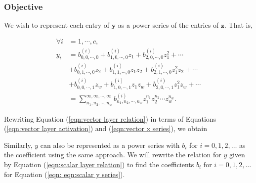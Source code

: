 \subsubsection{Objective}

We wish to represent each entry of $\mathbf{y}$ as a power series of the entries of $\mathbf{z}$. That is,

\begin{align}
    \forall i &= 1, \cdots, c, \nonumber \\ y_i
    &= b^{(i)}_{0,0,\cdots,0} + b^{(i)}_{1,0,\cdots,0} z_1 + b^{(i)}_{2,0,\cdots,0} z_1^2 + \cdots \nonumber \\
    &+ b^{(i)}_{0,1,\cdots,0} z_2 + b^{(i)}_{1,1,\cdots,0} z_1 z_2 + b^{(i)}_{2,1,\cdots,0} z_1^2 z_2 + \cdots \nonumber \\
    &+ b^{(i)}_{0,0,\cdots,1} z_w + b^{(i)}_{1,0,\cdots,1} z_1 z_w + b^{(i)}_{2,0,\cdots,1} z_1^2 z_w + \cdots \nonumber \\
    &= \sum_{n_1,n_2,\cdots,n_w}^{\infty,\infty,\cdots,\infty} b^{(i)}_{n_1,n_2,\cdots,n_w} z_1^{n_1} z_2^{n_2} \cdots z_w^{n_w}.
    \label{eqn:vector y series}
\end{align}

Rewriting Equation (\ref{eqn:vector layer relation}) in terms of Equations (\ref{eqn:vector layer activation}) and (\ref{eqn:vector x series}), we obtain

{\color{red} Similarly, $y$ can also be represented as a power series with $b_i$ for $i = 0, 1, 2, \ldots$ as the coefficient using the same approach. We will rewrite the relation for $y$ given by Equation (\ref{eqn:scalar layer relation}) to find the coefficients $b_i$ for $i = 0, 1, 2, \ldots$ for Equation (\ref{eqn: eqn:scalar y series}).}

